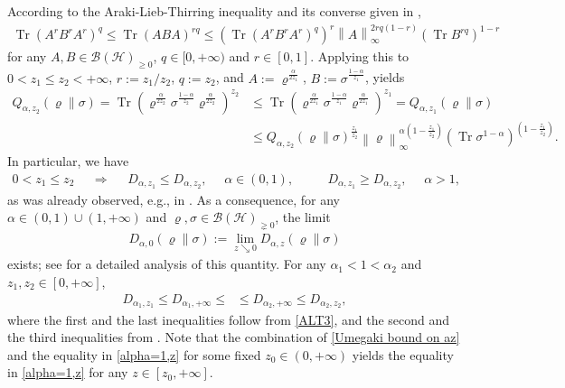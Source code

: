 \documentclass[unsortedaddress,superscriptaddress,pra,notitlepage]{revtex4}
\def\B{{\mathcal B}}
\def\rho{\varrho}
\def\hil{{\mathcal H}}
\def\imp{\Longrightarrow}
\def\bz{\left(}
\def\jz{\right)}
\def\p{_{\ge 0}}
\def\pne{_{\gneq 0}}
\def\valt{\cdot}
\newcommand{\ds}{\mbox{ }\mbox{ }}
\newcommand{\norm}[1]{\left\| #1\right\|}
\DeclareMathOperator{\Tr}{Tr}
\DeclareMathOperator{\DU}{\mathit{D}^{Um}}
\begin{document}
According to the Araki-Lieb-Thirring inequality \cite{Araki,LT} and its converse given in 
\cite{Audenaert-ALT}, 
\begin{align*}
\Tr (A^rB^rA^r)^q\le\Tr (ABA)^{rq}\le \bz\Tr (A^rB^rA^r)^q\jz^r\norm{A}_{\infty}^{2rq(1-r)}
(\Tr B^{rq})^{1-r}
\end{align*}
for any $A,B\in\B(\hil)\p$, $q\in[0,+\infty)$ and $r\in[0,1]$.
Applying this to
$0<z_1\le z_2<+\infty$, $r:=z_1/z_2$, $q:=z_2$, and 
$A:=\rho^{\frac{\alpha}{2z_1}}$, $B:=\sigma^{\frac{1-\alpha}{z_1}}$, yields
\begin{align}
Q_{\alpha,z_2}(\rho\|\sigma)
=
\Tr\bz\rho^{\frac{\alpha}{2z_2}}\sigma^{\frac{1-\alpha}{z_2}}\rho^{\frac{\alpha}{2z_2}}\jz^{z_2}
&\le
\Tr\bz\rho^{\frac{\alpha}{2z_1}}\sigma^{\frac{1-\alpha}{z_1}}\rho^{\frac{\alpha}{2z_1}}\jz^{z_1}=
Q_{\alpha,z_1}(\rho\|\sigma)
\label{ALT1}\\
&\le
Q_{\alpha,z_2}(\rho\|\sigma)^{\frac{z_1}{z_2}}\norm{\rho}_{\infty}^{\alpha\bz 1-\frac{z_1}{z_2}\jz}
\bz\Tr\sigma^{1-\alpha}\jz^{\bz 1-\frac{z_1}{z_2}\jz}.\label{ALT2}
\end{align}
In particular, we have 
\begin{align}\label{ALT3}
0<z_1\le z_2\ds\imp\ds
D_{\alpha,z_1}\le D_{\alpha,z_2},
\ds\alpha\in(0,1),\ds\ds
D_{\alpha,z_1}\ge D_{\alpha,z_2},\ds\alpha>1,
\end{align}
as was already observed, e.g., in \cite[Proposition 1]{LinTomamichel15}.
As a consequence, for any $\alpha\in(0,1)\cup(1,+\infty)$ and 
$\rho,\sigma\in\B(\hil)\pne$, the limit
\begin{align}\label{z=0 def}
D_{\alpha,0}(\rho\|\sigma):=\lim_{z\searrow 0}D_{\alpha,z}(\rho\|\sigma)
\end{align}
exists; see \cite{AH2019} for a detailed analysis of this quantity.
For any $\alpha_1<1<\alpha_2$ and $z_1,z_2\in[0,+\infty]$, 
\begin{align}\label{Umegaki bound on az}
D_{\alpha_1,z_1}\le
D_{\alpha_1,+\infty}\le
\DU\le 
D_{\alpha_2,+\infty}\le
D_{\alpha_2,z_2},
\end{align} 
where the first and the last inequalities follow from \eqref{ALT3},
and the second and the third inequalities from 
\cite[Theorem 3.6]{MO-cqconv}. 
Note that the combination of \eqref{Umegaki bound on az} and the equality in 
\eqref{alpha=1,z} for some fixed $z_0\in(0,+\infty)$ yields 
the equality in \eqref{alpha=1,z} for any $z\in[z_0,+\infty]$.
\end{document}

